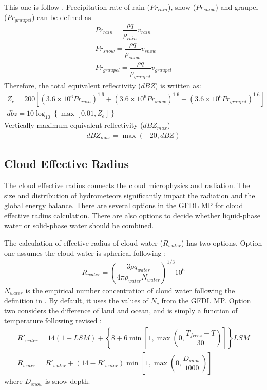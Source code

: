 \documentclass[letterpaper,titlepage,10pt]{article}
\numberwithin{equation}{section}
\begin{document}
This one is follow \cite{rogers1989asho}. Precipitation rate of rain ($Pr_{rain}$), snow ($Pr_{snow}$) and graupel ($Pr_{graupel}$) can be defined as
\begin{gather}
	Pr_{rain} = \dfrac{\rho q}{\rho_{rain}} v_{rain} \\
	Pr_{snow} = \dfrac{\rho q}{\rho_{snow}} v_{snow} \\
	Pr_{graupel} = \dfrac{\rho q}{\rho_{graupel}} v_{graupel}
\end{gather}
Therefore, the total equivalent reflectivity ($dBZ$) is written as:
\begin{gather}
	Z_e = 200 \left[\left(3.6 \times 10^6 Pr_{rain} \right)^{1.6} + \left(3.6 \times 10^6 Pr_{snow} \right)^{1.6} + \left(3.6 \times 10^6 Pr_{graupel} \right)^{1.6} \right] \\
	dbz = 10 \log_{10} \left\{\max \left[0.01, Z_e \right] \right\}
\end{gather}
Vertically maximum equivalent reflectivity ($dBZ_{max}$)
\begin{gather}
	dBZ_{max} = \max \left(-20, dBZ \right)
\end{gather}


\subsection{Cloud Effective Radius}

The cloud effective radius connects the cloud microphysics and radiation. The size and distribution of hydrometeors significantly impact the radiation and the global energy balance. There are several options in the GFDL MP for cloud effective radius calculation. There are also options to decide whether liquid-phase water or solid-phase water should be combined. 

The calculation of effective radius of cloud water ($R_{water}$) has two options. Option one assumes the cloud water is spherical following \citet{martin1994them}:
\begin{gather}
	R_{water} = \left(\dfrac{3 \rho q_{water}}{4 \pi \rho_{water} N_{water}} \right)^{1/3} 10^6
\end{gather}
$N_{water}$ is the empirical number concentration of cloud water following the definition in \citet{martin1994them}. By default, it uses the values of $N_c$ from the GFDL MP. Option two considers the difference of land and ocean, and is simply a function of temperature following revised \citet{kiehl1994sens}:
\begin{gather}
	R'_{water} = 14 (1 - LSM) + \left\{8 + 6 \min \left[1, \max \left(0, \dfrac{T_{freez} - T}{30} \right) \right] \right\} LSM \\
	R_{water} = R'_{water} + \left(14 - R'_{water} \right) \min \left[1, \max \left(0, \dfrac{D_{snow}}{1000} \right) \right]
\end{gather}
where $D_{snow}$ is snow depth.
\end{document}
